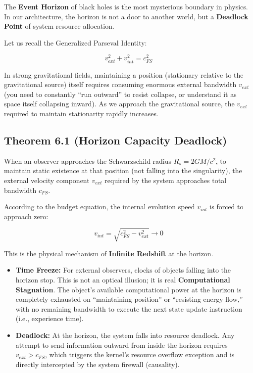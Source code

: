 The \textbf{Event Horizon} of black holes is the most mysterious boundary in physics. In our architecture, the horizon is not a door to another world, but a \textbf{Deadlock Point} of system resource allocation.

Let us recall the Generalized Parseval Identity:

$$v_{ext}^2 + v_{int}^2 = c_{FS}^2$$

In strong gravitational fields, maintaining a position (stationary relative to the gravitational source) itself requires consuming enormous external bandwidth \textbf{$v_{ext}$} (you need to constantly ``run outward'' to resist collapse, or understand it as space itself collapsing inward). As we approach the gravitational source, the \textbf{$v_{ext}$} required to maintain stationarity rapidly increases.

\subsection{Theorem 6.1 (Horizon Capacity Deadlock)}

When an observer approaches the Schwarzschild radius \textbf{$R_s = 2GM/c^2$}, to maintain static existence at that position (not falling into the singularity), the external velocity component \textbf{$v_{ext}$} required by the system approaches total bandwidth \textbf{$c_{FS}$}.

According to the budget equation, the internal evolution speed \textbf{$v_{int}$} is forced to approach zero:

$$v_{int} = \sqrt{c_{FS}^2 - v_{ext}^2} \to 0$$

This is the physical mechanism of \textbf{Infinite Redshift} at the horizon.

\begin{itemize}
\item \textbf{Time Freeze:} For external observers, clocks of objects falling into the horizon stop. This is not an optical illusion; it is real \textbf{Computational Stagnation}. The object's available computational power at the horizon is completely exhausted on ``maintaining position'' or ``resisting energy flow,'' with no remaining bandwidth to execute the next state update instruction (i.e., experience time).

\item \textbf{Deadlock:} At the horizon, the system falls into resource deadlock. Any attempt to send information outward from inside the horizon requires \textbf{$v_{ext} > c_{FS}$}, which triggers the kernel's resource overflow exception and is directly intercepted by the system firewall (causality).
\end{itemize}

